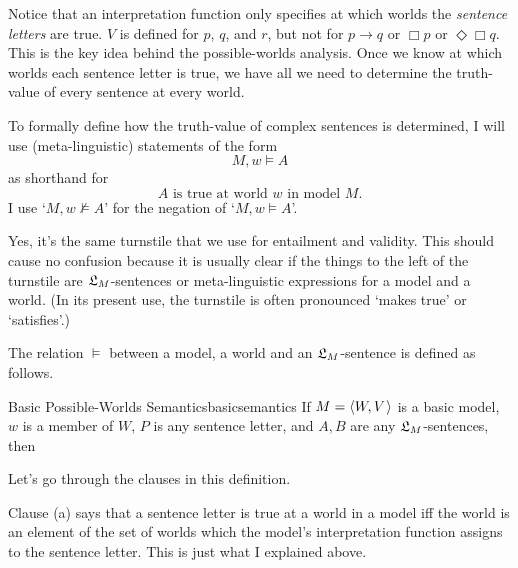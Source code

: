 Notice that an interpretation function only specifies at which worlds the
\emph{sentence letters} are true. $V$ is defined for $p$, $q$, and $r$, but not
for $p \to q$ or $\Box p$ or $\Diamond \Box q$. This is the key idea behind the
possible-worlds analysis. Once we know at which worlds each sentence letter is
true, we have all we need to determine the truth-value of every sentence at
every world.

To formally define how the truth-value of complex sentences is determined, I
will use (meta-linguistic) statements of the form
\[
  M,w \models A
\]
%
as shorthand for
%
\[
  \text{$A$ is true at world $w$ in model $M$}.
\]
I use `$M,w \not\models A$' for the negation of `$M,w \models A$'.

Yes, it's the same turnstile that we use for entailment and validity. This
should cause no confusion because it is usually clear if the things to the left
of the turnstile are $\mathfrak{L}_M$-sentences or meta-linguistic expressions for a model
and a world. (In its present use, the turnstile is often pronounced `makes true'
or `satisfies'.)

The relation $\models$ between a model, a world and an $\mathfrak{L}_M$-sentence is
defined as follows.

\begin{definition}{Basic Possible-Worlds Semantics}{basicsemantics}
  If $M = \t{W,V}$ is a basic model, $w$ is a member of $W$, $P$ is
  any sentence letter, and $A,B$ are any $\mathfrak{L}_M$-sentences, then

  \medskip
  \begin{semantics}
  \end{semantics}
\end{definition}

Let's go through the clauses in this definition.

Clause (a) says that a sentence letter is true at a world in a model iff the
world is an element of the set of worlds which the model's interpretation
function assigns to the sentence letter. This is just what I explained above.

